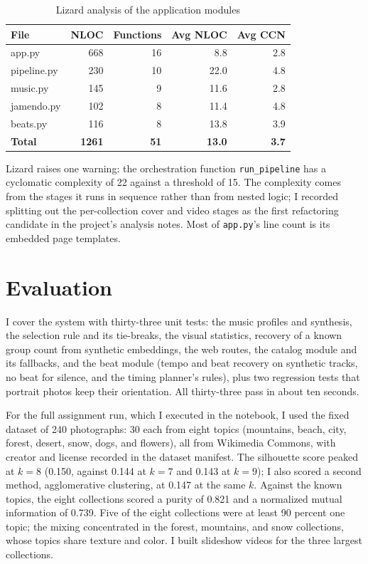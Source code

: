 \documentclass[conference]{IEEEtran}
\begin{document}
\begin{table}[htbp]
\caption{Lizard analysis of the application modules}
\begin{center}
\begin{tabular}{lrrrr}
\toprule
File & NLOC & Functions & Avg NLOC & Avg CCN \\
\midrule
app.py & 668 & 16 & 8.8 & 2.8 \\
pipeline.py & 230 & 10 & 22.0 & 4.8 \\
music.py & 145 & 9 & 11.6 & 2.8 \\
jamendo.py & 102 & 8 & 11.4 & 4.8 \\
beats.py & 116 & 8 & 13.8 & 3.9 \\
\textbf{Total} & \textbf{1261} & \textbf{51} & \textbf{13.0} & \textbf{3.7} \\
\bottomrule
\end{tabular}
\label{tab:lizard}
\end{center}
\end{table}

Lizard raises one warning: the orchestration function
\texttt{run\_pipeline} has a cyclomatic complexity of 22 against a
threshold of 15. The complexity comes from the stages it runs in
sequence rather than from nested logic; I recorded splitting out
the per-collection cover and video stages as the first refactoring
candidate in the project's analysis notes. Most of
\texttt{app.py}'s line count is its embedded page templates.

\section{Evaluation}
I cover the system with thirty-three unit tests: the music
profiles and synthesis, the selection rule and its tie-breaks, the
visual statistics, recovery of a known group count from synthetic
embeddings, the web routes, the catalog module and its fallbacks,
and the beat module (tempo and beat recovery on synthetic tracks,
no beat for silence, and the timing planner's rules), plus two
regression tests that portrait photos keep their orientation. All
thirty-three pass in about ten seconds.

For the full assignment run, which I executed in the notebook, I
used the fixed dataset of 240 photographs: 30 each from eight
topics (mountains, beach, city, forest, desert, snow, dogs, and
flowers), all from Wikimedia Commons, with creator and license
recorded in the dataset manifest. The silhouette score peaked at
$k = 8$ (0.150, against 0.144 at $k = 7$ and 0.143 at $k = 9$); I
also scored a second method, agglomerative clustering, at 0.147 at
the same $k$. Against the known topics, the eight collections
scored a purity of 0.821 and a normalized mutual information of
0.739. Five of the eight collections were at least 90 percent one
topic; the mixing concentrated in the forest, mountains, and snow
collections, whose topics share texture and color. I built
slideshow videos for the three largest collections.
\end{document}
